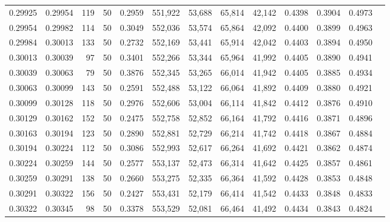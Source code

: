 \begin{tabular}{rrrrrrrrrrrrr}
0.29925 & 0.29954 &   119 &  50 &                                     0.2959 & 551,922 &  53,688 &  65,814 &  42,142 & 0.4398 & 0.3904 & 0.4973 \\
0.29954 & 0.29982 &   114 &  50 &                                     0.3049 & 552,036 &  53,574 &  65,864 &  42,092 & 0.4400 & 0.3899 & 0.4963 \\
0.29984 & 0.30013 &   133 &  50 &                                     0.2732 & 552,169 &  53,441 &  65,914 &  42,042 & 0.4403 & 0.3894 & 0.4950 \\
0.30013 & 0.30039 &    97 &  50 &                                     0.3401 & 552,266 &  53,344 &  65,964 &  41,992 & 0.4405 & 0.3890 & 0.4941 \\
0.30039 & 0.30063 &    79 &  50 &                                     0.3876 & 552,345 &  53,265 &  66,014 &  41,942 & 0.4405 & 0.3885 & 0.4934 \\
0.30063 & 0.30099 &   143 &  50 &                                     0.2591 & 552,488 &  53,122 &  66,064 &  41,892 & 0.4409 & 0.3880 & 0.4921 \\
0.30099 & 0.30128 &   118 &  50 &                                     0.2976 & 552,606 &  53,004 &  66,114 &  41,842 & 0.4412 & 0.3876 & 0.4910 \\
0.30129 & 0.30162 &   152 &  50 &                                     0.2475 & 552,758 &  52,852 &  66,164 &  41,792 & 0.4416 & 0.3871 & 0.4896 \\
0.30163 & 0.30194 &   123 &  50 &                                     0.2890 & 552,881 &  52,729 &  66,214 &  41,742 & 0.4418 & 0.3867 & 0.4884 \\
0.30194 & 0.30224 &   112 &  50 &                                     0.3086 & 552,993 &  52,617 &  66,264 &  41,692 & 0.4421 & 0.3862 & 0.4874 \\
0.30224 & 0.30259 &   144 &  50 &                                     0.2577 & 553,137 &  52,473 &  66,314 &  41,642 & 0.4425 & 0.3857 & 0.4861 \\
0.30259 & 0.30291 &   138 &  50 &                                     0.2660 & 553,275 &  52,335 &  66,364 &  41,592 & 0.4428 & 0.3853 & 0.4848 \\
0.30291 & 0.30322 &   156 &  50 &                                     0.2427 & 553,431 &  52,179 &  66,414 &  41,542 & 0.4433 & 0.3848 & 0.4833 \\
0.30322 & 0.30345 &    98 &  50 &                                     0.3378 & 553,529 &  52,081 &  66,464 &  41,492 & 0.4434 & 0.3843 & 0.4824 \\

\end{tabular}
